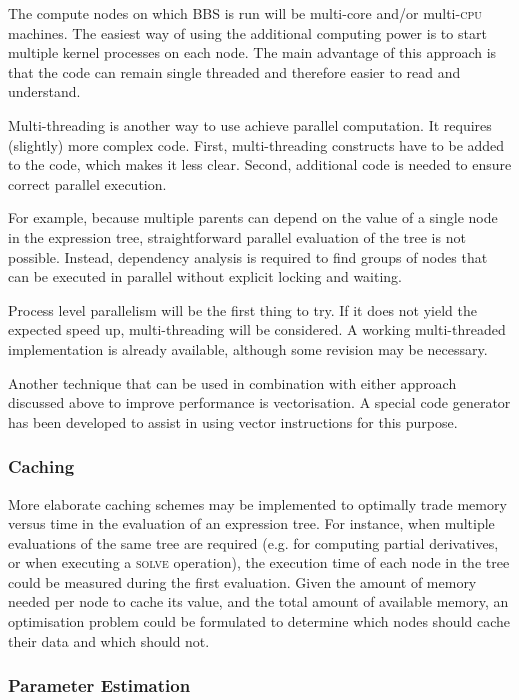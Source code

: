 \documentclass[10pt]{lofar}
\newcommand{\solve}{\textsc{solve}\xspace}
\begin{document}
The compute nodes on which BBS is run will be multi-core and/or
multi-\textsc{cpu} machines. The easiest way of using the additional computing
power is to start multiple kernel processes on each node. The main advantage of
this approach is that the code can remain single threaded and therefore easier
to read and understand.

Multi-threading is another way to use achieve parallel computation. It requires
(slightly) more complex code. First, multi-threading constructs have to be added
to the code, which makes it less clear. Second, additional code is needed to
ensure correct parallel execution.

For example, because multiple parents can depend on the value of a single node
in the expression tree, straightforward parallel evaluation of the tree is not
possible. Instead, dependency analysis is required to find groups of nodes that
can be executed in parallel without explicit locking and waiting.

Process level parallelism will be the first thing to try. If it does not yield
the expected speed up, multi-threading will be considered. A working
multi-threaded implementation is already available, although some revision may
be necessary.

Another technique that can be used in combination with either approach discussed
above to improve performance is vectorisation. A special code generator has been
developed to assist in using vector instructions for this purpose.

\subsubsection{Caching}
\label{subsubsec:performance-caching}

More elaborate caching schemes may be implemented to optimally trade memory
versus time in the evaluation of an expression tree. For instance, when multiple
evaluations of the same tree are required (e.g. for computing partial
derivatives, or when executing a \solve operation), the execution time of each
node in the tree could be measured during the first evaluation. Given the amount
of memory needed per node to cache its value, and the total amount of available
memory, an optimisation problem could be formulated to determine which nodes
should cache their data and which should not. 

\subsubsection{Parameter Estimation}
\label{subsubsec:performance-parameter-estimation}
\end{document}
